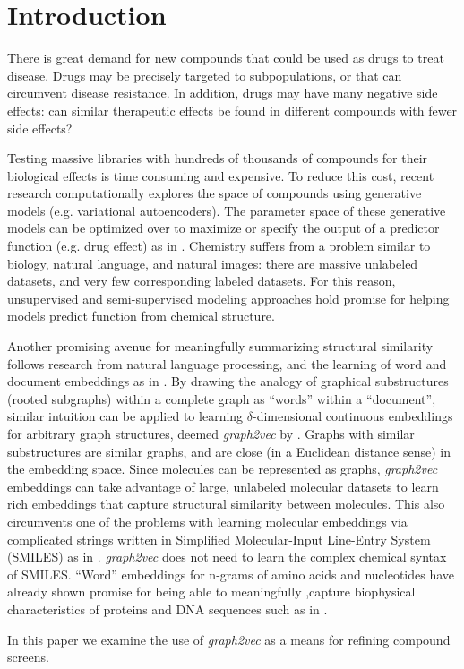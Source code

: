 \section{Introduction}

There is great demand for new compounds that could be used as drugs to treat disease. Drugs may be precisely targeted to subpopulations, or that can circumvent disease resistance. In addition, drugs may have many negative side effects: can similar therapeutic effects be found in different compounds with fewer side effects?

Testing massive libraries with hundreds of thousands of compounds for their biological effects is time consuming and expensive. To reduce this cost, recent research computationally explores the space of compounds using generative models (e.g. variational autoencoders). The parameter space of these generative models can be optimized over to maximize or specify the output of a predictor function (e.g. drug effect) as in \citet{Brookes2018, Gomez-Bombarelli2018}. Chemistry suffers from a problem similar to biology, natural language, and natural images: there are massive unlabeled datasets, and very few corresponding labeled datasets. For this reason, unsupervised and semi-supervised modeling approaches hold promise for helping models predict function from chemical structure.

Another promising avenue for meaningfully summarizing structural similarity follows research from natural language processing, and the learning of word and document embeddings as in \citet{Goldberg2014}. By drawing the analogy of graphical substructures (rooted subgraphs) within a complete graph as ``words'' within a ``document'', similar intuition can be applied to learning $\delta$-dimensional continuous embeddings for arbitrary graph structures, deemed \textit{graph2vec} by \citet{Narayanan}. Graphs with similar substructures are similar graphs, and are close (in a Euclidean distance sense) in the embedding space. Since molecules can be represented as graphs, \textit{graph2vec} embeddings can take advantage of large, unlabeled molecular datasets to learn rich embeddings that capture structural similarity between molecules. This also circumvents one of the problems with learning molecular embeddings via complicated strings written in Simplified Molecular-Input Line-Entry System (SMILES) as in \citet{Gomez-Bombarelli2018}. \textit{graph2vec} does not need to learn the complex chemical syntax of SMILES. ``Word'' embeddings for n-grams of amino acids and nucleotides have already shown promise for being able to meaningfully ,capture biophysical characteristics of proteins and DNA sequences such as in \citet{Hamid2018, Asgari2015}.

In this paper we examine the use of \textit{graph2vec} as a means for refining compound screens.

